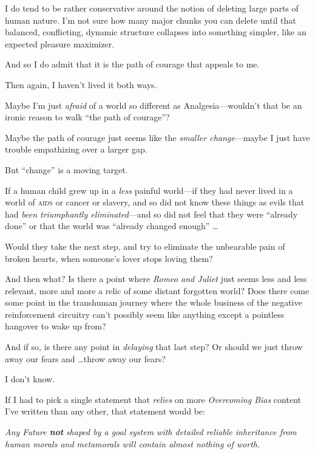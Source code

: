{
 I do tend to be rather conservative around the notion of deleting
large parts of human nature. I'm not sure how many
major chunks you can delete until that balanced, conflicting, dynamic
structure collapses into something simpler, like an expected pleasure
maximizer.}

{
 And so I do admit that it is the path of courage that appeals to
me.}

{
 Then again, I haven't lived it both ways.}

{
 Maybe I'm just \textit{afraid} of a world so
different as Analgesia---wouldn't that be an ironic
reason to walk ``the path of
courage''?}

{
 Maybe the path of courage just seems like the \textit{smaller
change}{}---maybe I just have trouble empathizing over a larger gap.}

{
 But ``change'' is a moving
target.}

{
 If a human child grew up in a \textit{less} painful world---if
they had never lived in a world of \textsc{aids} or cancer or slavery, and so
did not know these things as evils that had \textit{been triumphantly
eliminated}{}---and so did not feel that they were
``already done'' or that the world
was ``already changed enough''
\ldots}

{
 Would they take the next step, and try to eliminate the unbearable
pain of broken hearts, when someone's lover stops
loving them?}

{
 And then what? Is there a point where \textit{Romeo and Juliet}
just seems less and less relevant, more and more a relic of some
distant forgotten world? Does there come some point in the transhuman
journey where the whole business of the negative reinforcement
circuitry can't possibly seem like anything except a
pointless hangover to wake up from?}

{
 And if so, is there any point in \textit{delaying} that last step?
Or should we just throw away our fears and \ldots throw away our fears?}

{
 I don't know.}

\myendsectiontext


\bigskip


{
 If I had to pick a single statement that \textit{relies} on more
\textit{Overcoming Bias} content I've written than any
other, that statement would be: }

{
 \textit{Any Future }\textbf{\textit{not}}\textit{ shaped by a goal
system with detailed reliable inheritance from human morals and
metamorals will contain almost nothing of worth.}}

